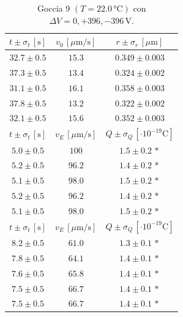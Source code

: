 \documentclass[]{article}
\begin{document}
    \begin{table}[H]
        \centering
        \begin{tabular}{||c|c|c||}
            \hline
            $t \pm \sigma_t \, \left[\text{s}\right]$ & $v_0 \, \left[\mu\text{m/s}\right]$ & $r \pm \sigma_r \, \left[\mu\text{m}\right]$ \\\hline
            \hline
            $32.7 \pm 0.5$ & $15.3$ & $0.349 \pm 0.003$ \\\hline
            $37.3 \pm 0.5$ & $13.4$ & $0.324 \pm 0.002$ \\\hline
            $31.1 \pm 0.5$ & $16.1$ & $0.358 \pm 0.003$ \\\hline
            $37.8 \pm 0.5$ & $13.2$ & $0.322 \pm 0.002$ \\\hline
            $32.1 \pm 0.5$ & $15.6$ & $0.352 \pm 0.003$ \\\hline
            \hline
            $t \pm \sigma_t \, \left[\text{s}\right]$ & $v_E \, \left[\mu\text{m/s}\right]$ & $Q \pm \sigma_Q \, \left[\cdot 10^{-19} \text{C}\right]$ \\\hline
            \hline
            $5.0 \pm 0.5$ & $100 $ & $1.5 \pm 0.2\,\ast$ \\\hline
            $5.2 \pm 0.5$ & $96.2$ & $1.4 \pm 0.2\,\ast$ \\\hline
            $5.1 \pm 0.5$ & $98.0$ & $1.5 \pm 0.2\,\ast$ \\\hline
            $5.2 \pm 0.5$ & $96.2$ & $1.4 \pm 0.2\,\ast$ \\\hline
            $5.1 \pm 0.5$ & $98.0$ & $1.5 \pm 0.2\,\ast$ \\\hline
            \hline
            $t \pm \sigma_t \, \left[\text{s}\right]$ & $v_E \, \left[\mu\text{m/s}\right]$ & $Q \pm \sigma_Q \, \left[\cdot 10^{-19} \text{C}\right]$ \\\hline
            \hline
            $8.2 \pm 0.5$ & $61.0$ & $1.3 \pm 0.1\,\ast$ \\\hline
            $7.8 \pm 0.5$ & $64.1$ & $1.4 \pm 0.1\,\ast$ \\\hline
            $7.6 \pm 0.5$ & $65.8$ & $1.4 \pm 0.1\,\ast$ \\\hline
            $7.5 \pm 0.5$ & $66.7$ & $1.4 \pm 0.1\,\ast$ \\\hline
            $7.5 \pm 0.5$ & $66.7$ & $1.4 \pm 0.1\,\ast$ \\\hline
        \end{tabular}
        \caption{Goccia 9 $\left(T = 22.0\, \text{°C}\right)$ con $\Delta V = 0,+396,-396 \,\text{V}$.}
        \label{goccia-9}
    \end{table}
\end{document}
